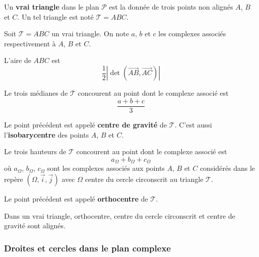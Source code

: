 	\begin{definition}
		Un \textbf{vrai triangle} dans le plan $\mathcal{P}$ est la donnée de trois points non alignés $A$, $B$ et $C$. Un tel triangle est noté $\mathcal{T} = ABC$.
	\end{definition}
	
	Soit $\mathcal{T} = ABC$ un vrai triangle. On note $a$, $b$ et $c$ les complexes associés respectivement à $A$, $B$ et $C$.
	
	\begin{theorem}
		L'aire de $ABC$ est
		\[ \frac{1}{2} \left| \det\left( \overrightarrow{AB}, \overrightarrow{AC} \right) \right| \]
	\end{theorem}
	
	\begin{proposition}
		Le trois médianes de $\mathcal{T}$ concourent au point dont le complexe associé est
		\[ \frac{a+b+c}{3} \]
	\end{proposition}
	
	\begin{definition}
		Le point précédent est appelé \textbf{centre de gravité} de $\mathcal{T}$. C'est aussi l'\textbf{isobarycentre} des points $A$, $B$ et $C$.
	\end{definition}
	
	\begin{proposition}
		Le trois hauteurs de $\mathcal{T}$ concourent au point dont le complexe associé est
		\[ a_\Omega + b_\Omega + c_\Omega \]
		où $a_\Omega$, $b_\Omega$, $c_\Omega$ sont les complexes associés aux points $A$, $B$ et $C$ considérés dans le repère $(\Omega, \overrightarrow{i}, \overrightarrow{j})$ avec $\Omega$ centre du cercle circonscrit au triangle $\mathcal{T}$.
	\end{proposition}
	
	\begin{definition}
		Le point précédent est appelé \textbf{orthocentre} de $\mathcal{T}$.
	\end{definition}
	
	\begin{proposition}
		Dans un vrai triangle, orthocentre, centre du cercle circonscrit et centre de gravité sont alignés.
	\end{proposition}
	
	\subsubsection{Droites et cercles dans le plan complexe}
	
